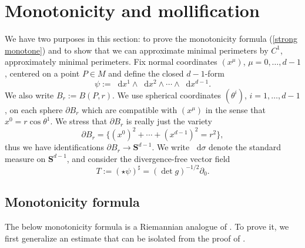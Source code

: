 \documentclass[reqno,12pt,letterpaper]{amsart}
\newcommand{\Sph}{\mathbf S}
\newcommand*\dif{\mathop{}\!\mathrm{d}}
\theoremstyle{definition}
\numberwithin{equation}{section}
\begin{document}
\section{Monotonicity and mollification}\label{MollifierSection}
We have two purposes in this section: to prove the monotonicity formula (\ref{strong monotone}) and to show that we can approximate minimal perimeters by $C^1$, approximately minimal perimeters.
Fix normal coordinates $(x^\mu)$, $\mu = 0, \dots, d - 1$, centered on a point $P \in M$ and define the closed $d-1$-form
\begin{equation}\label{d1 form}
\psi := \dif x^1 \wedge \dif x^2 \wedge \cdots \wedge \dif x^{d - 1}.
\end{equation}
We also write $B_r := B(P, r)$.
We use spherical coordinates $(\theta^i)$, $i = 1, \dots, d - 1$, on each sphere $\partial B_r$ which are compatible with $(x^\mu)$ in the sense that $x^0 = r \cos \theta^1$. We stress that $\partial B_r$ is really just the variety 
\begin{equation}\label{partial Br is a variety}
\partial B_r = \{(x^0)^2 + \cdots + (x^{d - 1})^2 = r^2\},
\end{equation}
thus we have identifications $\partial B_r \to \Sph^{d - 1}$.
We write $\dif \sigma$ denote the standard measure on $\Sph^{d - 1}$, and consider the divergence-free vector field
\begin{equation}\label{T in coords}
T := (\star \psi)^\sharp = (\det g)^{-1/2} \partial_0.
\end{equation}

\subsection{Monotonicity formula}
The below monotonicity formula is a Riemannian analogue of \cite[Proposition 5.12]{Giusti77}.
To prove it, we first generalize an estimate that can be isolated from the proof of \cite[Lemma 5.8]{Giusti77}.
\end{document}
